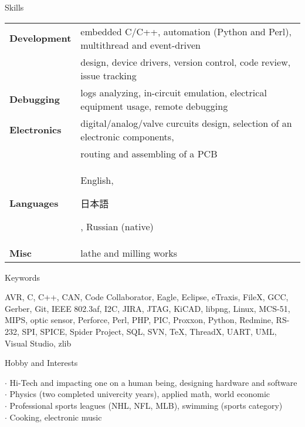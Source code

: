 \documentclass{template}
\begin{document}

\begin{rSection}{Skills}

\begin{tabular}{ @{} >{\bfseries}l @{\hspace{6ex}} l }
Development & embedded C/C++, automation (Python and Perl), multithread and event-driven \\
            & design, device drivers, version control, code review, issue tracking \\
Debugging   & logs analyzing, in-circuit emulation, electrical equipment usage, remote debugging \\
Electronics & digital/analog/valve curcuits design, selection of an electronic components, \\
            & routing and assembling of a PCB \\
Languages   & English, \begin{CJK}{UTF8}{min}日本語\end{CJK}, Russian (native) \\
Misc        & lathe and milling works
\end{tabular}

\end{rSection}


\begin{rSection}{Keywords}

AVR, C, C++, CAN, Code Collaborator, Eagle, Eclipse, eTraxis, FileX, GCC, Gerber, Git, IEEE 802.3af, I2C, JIRA, JTAG, KiCAD, libpng, Linux, MCS-51, MIPS, optic sensor, Perforce, Perl, PHP, PIC, Proxxon, Python, Redmine, RS-232, SPI, SPICE, Spider Project, SQL, SVN, \TeX, ThreadX, UART, UML, Visual Studio, zlib

\end{rSection}


\begin{rSection}{Hobby and Interests}

$\cdot$ Hi-Tech and impacting one on a human being, designing hardware and software \\
$\cdot$ Physics (two completed univercity years), applied math, world economic \\
$\cdot$ Professional sports leagues (NHL, NFL, MLB),  swimming (sports category) \\
$\cdot$ Cooking, electronic music

\end{rSection}

\end{document}
